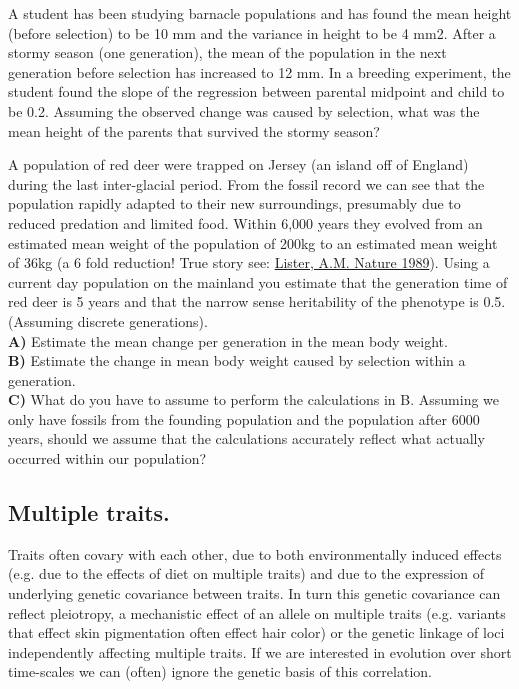\begin{question}
A student has been studying barnacle populations and has found the mean height (before selection) to be 10 mm and the variance in height to be 4 mm2.  After a stormy season (one generation), the mean of the population in the next generation before selection has increased to 12 mm.  In a breeding experiment, the student found the slope of the regression between parental midpoint and child to be 0.2.  Assuming the observed change was caused by selection, what was the mean height of the parents that survived the stormy season?  
\end{question}

\begin{question}
A population of red deer were trapped on Jersey (an island off of
England) during the last inter-glacial period. From the fossil record
we can see that the population rapidly adapted to their new
surroundings, presumably due to reduced predation and limited
food. Within 6,000 years they evolved from an estimated mean weight of
the population of 200kg to an estimated mean weight of 36kg (a 6 fold
reduction! True story see: \href{http://www.nature.com/nature/journal/v342/n6249/abs/342539a0.html}{Lister, A.M. Nature 1989}). Using a current
day population on the mainland you estimate that the generation time
of red deer is 5 years and that the narrow sense heritability of the
phenotype is 0.5. (Assuming discrete generations).\\
{\bf A)}	Estimate the mean change per generation in the mean body weight. \\

{\bf B)}	Estimate the change in mean body weight caused by selection within a generation.\\

{\bf C)}	What do you have to assume to perform the calculations in B. Assuming we only have fossils from the founding population and the population after 6000 years, should we assume that the calculations accurately reflect what actually occurred within our population?
\end{question}

\subsection{Multiple traits.}

Traits often covary with each other, due to both environmentally
induced effects (e.g. due to the effects of diet on multiple traits)
and due to the expression of underlying genetic covariance between
traits. In turn this genetic covariance can reflect pleiotropy, a
mechanistic effect of an allele on multiple traits (e.g. variants that
effect skin pigmentation often effect hair color) or the genetic
linkage of loci independently affecting multiple traits. If we are
interested in evolution over short time-scales we can (often) ignore
the genetic basis of this correlation. 

